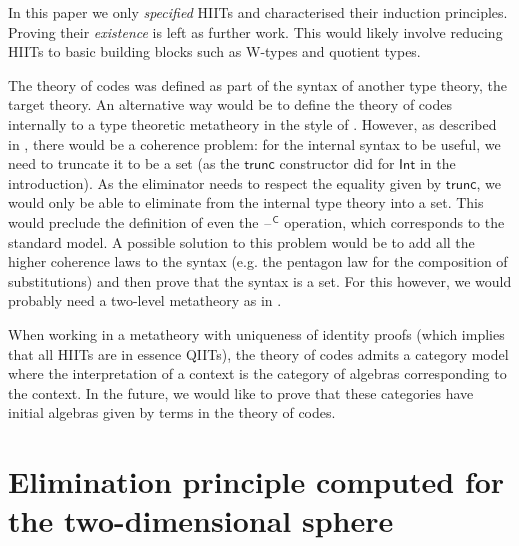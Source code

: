 \documentclass[a4paper,UKenglish]{lipics-v2018}
\newcommand{\blank}{\mathord{\hspace{1pt}\text{--}\hspace{1pt}}} %
\newcommand{\C}{\mathsf{C}}
\newcommand{\1}{\mathsf{1}} \renewcommand{\Pr}{\mathsf{Pr}}
\newcommand{\Int}{\mathsf{Int}}
\begin{document}
In this paper we only \emph{specified} HIITs and characterised their
induction principles. Proving their \emph{existence} is left as
further work. This would likely involve reducing HIITs to basic
building blocks such as W-types and quotient types.

The theory of codes was defined as part of the syntax of another type
theory, the target theory. An alternative way would be to define
the theory of codes internally to a type theoretic metatheory in the
style of \cite{ttintt}. However, as described in \cite[Section
  6]{ttintt}, there would be a coherence problem: for the internal
syntax to be useful, we need to truncate it to be a set (as the
$\mathsf{trunc}$ constructor did for $\Int$ in the introduction). As
the eliminator needs to respect the equality given by
$\mathsf{trunc}$, we would only be able to eliminate from the internal
type theory into a set. This would preclude the definition of even the
$\blank^\C$ operation, which corresponds to the standard model. A
possible solution to this problem would be to add all the higher
coherence laws to the syntax (e.g. the pentagon law for the
composition of substitutions) and then prove that the syntax is a
set. For this however, we would probably need a two-level metatheory
as in \cite{semisegal}.

When working in a metatheory with uniqueness of identity proofs (which
implies that all HIITs are in essence QIITs), the theory of codes
admits a category model where the interpretation of a context is the
category of algebras corresponding to the context. In the future, we
would like to prove that these categories have initial algebras given
by terms in the theory of codes.


\appendix
\section{Elimination principle computed for the two-dimensional sphere}
\label{sec:app}
\end{document}
